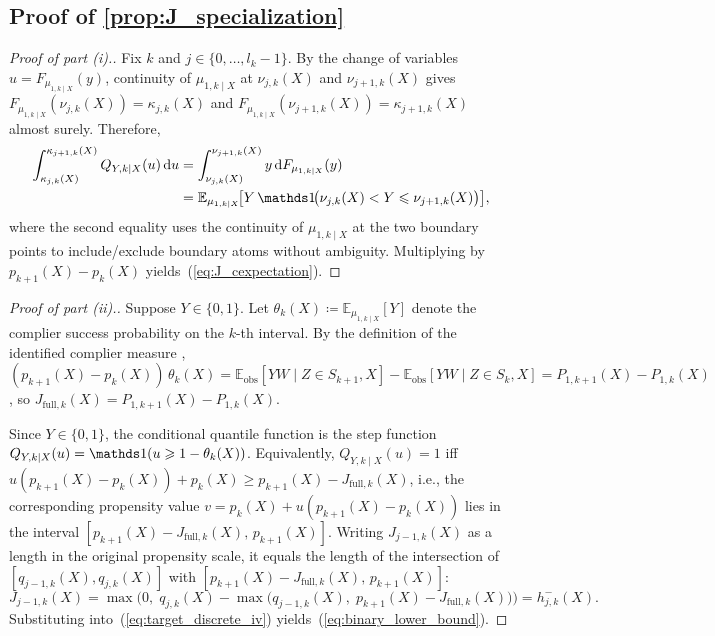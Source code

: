 \subsection{Proof of \cref{prop:J_specialization}}\label{app:J_specialization}

\begin{proof}[Proof of part (i).] Fix $k$ and $j \in \{0,\dots,l_k-1\}$. By the change of variables $u = F_{\mu_{1,k\mid X}}(y)$, continuity of $\mu_{1,k\mid X}$ at $\nu_{j,k}(X)$ and $\nu_{j+1,k}(X)$ gives $F_{\mu_{1,k\mid X}}(\nu_{j,k}(X)) = \kappa_{j,k}(X)$ and $F_{\mu_{1,k\mid X}}(\nu_{j+1,k}(X)) = \kappa_{j+1,k}(X)$ almost surely. Therefore,
\begin{align*}
    \int_{\kappa_{j,k}(X)}^{\kappa_{j+1,k}(X)} Q_{Y,k\mid X}(u)\,\mathrm{d}u &= \int_{\nu_{j,k}(X)}^{\nu_{j+1,k}(X)} y\, \mathrm{d}F_{\mu_{1,k\mid X}}(y) \\
    &= \mathbb{E}_{\mu_{1,k\mid X}}\!\big[Y\,\indicator\!\big(\nu_{j,k}(X) < Y \leqslant \nu_{j+1,k}(X)\big)\big],
\end{align*}
where the second equality uses the continuity of $\mu_{1,k\mid X}$ at the two boundary points to include/exclude boundary atoms without ambiguity. Multiplying by $p_{k+1}(X)-p_k(X)$ yields~(\ref{eq:J_cexpectation}).
\end{proof}

\begin{proof}[Proof of part (ii).] Suppose $Y \in \{0,1\}$. Let $\theta_k(X) \coloneqq \mathbb{E}_{\mu_{1,k\mid X}}[Y]$ denote the complier success probability on the $k$-th interval. By the definition of the identified complier measure \citep[cf.][]{angrist1995identification}, $(p_{k+1}(X)-p_k(X))\,\theta_k(X) = \mathbb{E}_{\text{obs}}[YW \mid Z \in S_{k+1}, X] - \mathbb{E}_{\text{obs}}[YW \mid Z \in S_k, X] = P_{1,k+1}(X) - P_{1,k}(X)$, so $J_{\text{full},k}(X) = P_{1,k+1}(X) - P_{1,k}(X)$.

Since $Y \in \{0,1\}$, the conditional quantile function is the step function $Q_{Y,k\mid X}(u) = \indicator(u \geqslant 1 - \theta_k(X))$. Equivalently, $Q_{Y,k\mid X}(u) = 1$ iff $u(p_{k+1}(X) - p_k(X)) + p_k(X) \geqslant p_{k+1}(X) - J_{\text{full},k}(X)$, i.e., the corresponding propensity value $v = p_k(X) + u(p_{k+1}(X)-p_k(X))$ lies in the interval $[p_{k+1}(X) - J_{\text{full},k}(X),\, p_{k+1}(X)]$. Writing $J_{j-1,k}(X)$ as a length in the original propensity scale, it equals the length of the intersection of $[q_{j-1,k}(X), q_{j,k}(X)]$ with $[p_{k+1}(X) - J_{\text{full},k}(X),\, p_{k+1}(X)]$:
\begin{equation*}
    J_{j-1,k}(X) = \max\!\Big(0,\; q_{j,k}(X) - \max\!\big(q_{j-1,k}(X),\; p_{k+1}(X) - J_{\text{full},k}(X)\big)\Big) = h_{j,k}^{-}(X).
\end{equation*}
Substituting into~(\ref{eq:target_discrete_iv}) yields~(\ref{eq:binary_lower_bound}).
\end{proof}

